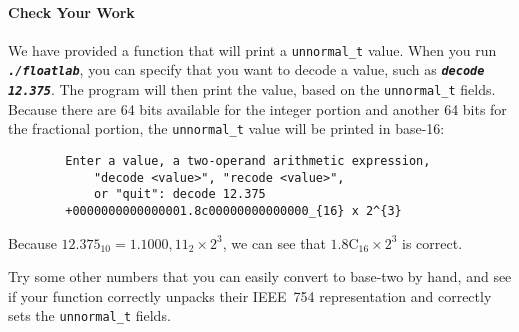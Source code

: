 \paragraph*{Check Your Work}

We have provided a function that will print a \lstinline{unnormal_t} value.
When you run \texttt{\textbf{\textit{./floatlab}}}, you can specify that you want to decode a value, such as \texttt{\textbf{\textit{decode 12.375}}}.
The program will then print the value, based on the \lstinline{unnormal_t} fields.
Because there are 64 bits available for the integer portion and another 64 bits for the fractional portion, the \lstinline{unnormal_t} value will be printed in base-16:

\begin{verbatim}
        Enter a value, a two-operand arithmetic expression,
            "decode <value>", "recode <value>",
            or "quit": decode 12.375
        +0000000000000001.8c00000000000000_{16} x 2^{3}
\end{verbatim}

Because $12.375_{10} = 1.1000,11_{2} \times 2^3$, we can see that $1.8\mathrm{C}_{16} \times 2^3$ is correct.

%
%
%

Try some other numbers that you can easily convert to base-two by hand, and see if your  function correctly unpacks their IEEE~754 representation and correctly sets the \lstinline{unnormal_t} fields.
